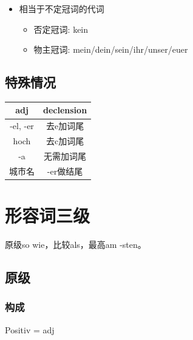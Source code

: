\begin{itemize}
\begin{itemize}
                    \begin{itemize}
                        \item dies- (this)
                        \item solch- (such)
                    \end{itemize}
          \end{itemize}
    \item 相当于不定冠词的代词
          \begin{itemize}
              \item 否定冠词: kein
              \item 物主冠词: mein/dein/sein/ihr/unser/euer
          \end{itemize}
\end{itemize}

\subsection{特殊情况}
\begin{center}
    \begin{tabular}{|c|c|}
        \hline
        \rowcolor{gray}
        adj      & declension \\
        \hline
        -el, -er & 去e加词尾      \\
        \hline
        hoch     & 去c加词尾      \\
        \hline
        -a       & 无需加词尾      \\
        \hline
        城市名      & -er做结尾     \\
        \hline
    \end{tabular}
\end{center}

\section{形容词三级}
\begin{center}
    \begin{myquote}
        原级so wie，比较als，最高am -sten。\\
    \end{myquote}
\end{center}

\subsection{原级}
\subsubsection{构成}
Positiv = adj
